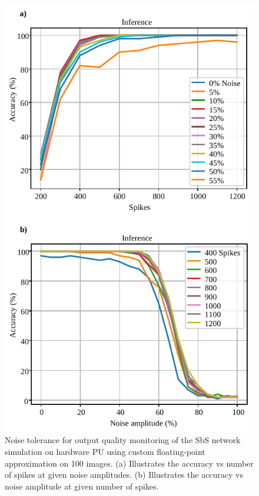 \begin{figure}[h!]
	\centering
	\includegraphics[width=1\columnwidth]{../figures/accuracy_vs_noise_pu_cfp(4-bit-exponent_1-bit-mantissa).pdf}
	\caption{Noise tolerance for output quality monitoring of the SbS network simulation on hardware PU using custom floating-point approximation on 100 images. (a) Illustrates the accuracy vs number of spikes at given noise amplitudes. (b) Illustrates the accuracy vs noise amplitude at given number of spikes.}
	\label{fig:accuracy_vs_noise_pu_cfp}
\end{figure}

